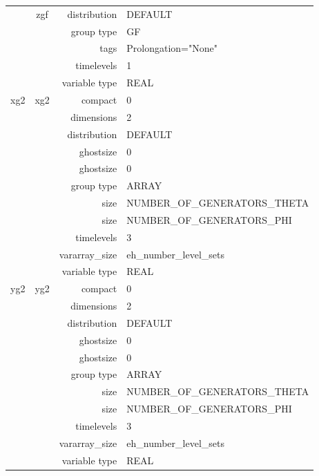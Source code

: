 \begin{tabular*}{150mm}{|c|c@{\extracolsep{\fill}}|rl|}
 & zgf & distribution & DEFAULT \\ 
 &  & group type & GF \\ 
 &  & tags & Prolongation="None" \\ 
 &  & timelevels & 1 \\ 
 &  & variable type & REAL \\ 
\hline 
xg2 & xg2 & compact & 0 \\ 
 &  & dimensions & 2 \\ 
 &  & distribution & DEFAULT \\ 
 &  & ghostsize & 0 \\ 
& ~ & ghostsize & 0 \\ 
 &  & group type & ARRAY \\ 
 &  & size & NUMBER\_OF\_GENERATORS\_THETA \\ 
& ~ & size & NUMBER\_OF\_GENERATORS\_PHI \\ 
 &  & timelevels & 3 \\ 
 &  & vararray\_size & eh\_number\_level\_sets \\ 
 &  & variable type & REAL \\ 
\hline 
yg2 & yg2 & compact & 0 \\ 
 &  & dimensions & 2 \\ 
 &  & distribution & DEFAULT \\ 
 &  & ghostsize & 0 \\ 
& ~ & ghostsize & 0 \\ 
 &  & group type & ARRAY \\ 
 &  & size & NUMBER\_OF\_GENERATORS\_THETA \\ 
& ~ & size & NUMBER\_OF\_GENERATORS\_PHI \\ 
 &  & timelevels & 3 \\ 
 &  & vararray\_size & eh\_number\_level\_sets \\ 
 &  & variable type & REAL \\ 
\hline 
\end{tabular*} 



\vspace{5mm}
\vspace{5mm}

